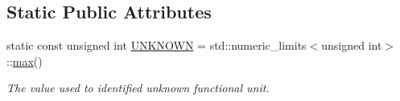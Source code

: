 \subsection*{Static Public Attributes}
\begin{DoxyCompactItemize}
\item 
static const unsigned int \hyperlink{classfu__binding_acf9c4a06a84cfd86f7e6b8259f5a1315}{U\+N\+K\+N\+O\+WN} = std\+::numeric\+\_\+limits$<$unsigned int$>$\+::\hyperlink{tutorial__pact__2019_2Target-Customization_2first_2hint_8c_a28f422940797ea297699ba55d89171c5}{max}()
\begin{DoxyCompactList}\small\item\em The value used to identified unknown functional unit. \end{DoxyCompactList}\end{DoxyCompactItemize}
